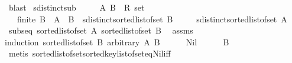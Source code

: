 \begin{isabellebody}
\ blast%
\endisatagproof
{\isafoldproof}%
%
\isadelimproof
\isanewline
%
\endisadelimproof
\isanewline
{}\isamarkupfalse%
\ sdistinct{\isacharunderscore}{\kern0pt}sub{\isacharcolon}{\kern0pt}\isanewline
\ \ \ \ \ A\ B\ {\isacharcolon}{\kern0pt}{\isacharcolon}{\kern0pt}\ {\isachardoublequoteopen}R{}\ set{\isachardoublequoteclose}\isanewline
\ \ \ {\isachardoublequoteopen}finite\ B{\isachardoublequoteclose}\ \ {\isachardoublequoteopen}A\ {\isasymsubseteq}\ B{\isachardoublequoteclose}\ \ {\isachardoublequoteopen}sdistinct{\isacharparenleft}{\kern0pt}sorted{\isacharunderscore}{\kern0pt}list{\isacharunderscore}{\kern0pt}of{\isacharunderscore}{\kern0pt}set\ B{\isacharparenright}{\kern0pt}{\isachardoublequoteclose}\isanewline
\ \ \ \ \ {\isachardoublequoteopen}sdistinct{\isacharparenleft}{\kern0pt}sorted{\isacharunderscore}{\kern0pt}list{\isacharunderscore}{\kern0pt}of{\isacharunderscore}{\kern0pt}set\ A{\isacharparenright}{\kern0pt}{\isachardoublequoteclose}\isanewline
%
\isadelimproof
%
\endisadelimproof
%
\isatagproof
{}\isamarkupfalse%
{\isacharminus}{\kern0pt}\isanewline
\ \ \isamarkupfalse%
\ {\isachardoublequoteopen}subseq\ {\isacharparenleft}{\kern0pt}sorted{\isacharunderscore}{\kern0pt}list{\isacharunderscore}{\kern0pt}of{\isacharunderscore}{\kern0pt}set\ A{\isacharparenright}{\kern0pt}\ {\isacharparenleft}{\kern0pt}sorted{\isacharunderscore}{\kern0pt}list{\isacharunderscore}{\kern0pt}of{\isacharunderscore}{\kern0pt}set\ B{\isacharparenright}{\kern0pt}{\isachardoublequoteclose}\ \isamarkupfalse%
\ assms{\isacharparenleft}{\kern0pt}{}{\isacharcomma}{\kern0pt}{}{\isacharparenright}{\kern0pt}\isanewline
\ \ \isamarkupfalse%
{\isacharparenleft}{\kern0pt}induction\ {\isachardoublequoteopen}sorted{\isacharunderscore}{\kern0pt}list{\isacharunderscore}{\kern0pt}of{\isacharunderscore}{\kern0pt}set\ B{\isachardoublequoteclose}\ arbitrary{\isacharcolon}{\kern0pt}\ A\ B{\isacharparenright}{\kern0pt}\isanewline
\ \ \ \ \isamarkupfalse%
\ Nil\isanewline
\ \ \ \ \isamarkupfalse%
\ {\isachardoublequoteopen}B\ {\isacharequal}{\kern0pt}\ {\isacharbraceleft}{\kern0pt}{\isacharbraceright}{\kern0pt}{\isachardoublequoteclose}\isanewline
\ \ \ \ \ \ \isamarkupfalse%
\ {\isacharparenleft}{\kern0pt}metis\ sorted{\isacharunderscore}{\kern0pt}list{\isacharunderscore}{\kern0pt}of{\isacharunderscore}{\kern0pt}set{\isachardot}{\kern0pt}sorted{\isacharunderscore}{\kern0pt}key{\isacharunderscore}{\kern0pt}list{\isacharunderscore}{\kern0pt}of{\isacharunderscore}{\kern0pt}set{\isacharunderscore}{\kern0pt}eq{\isacharunderscore}{\kern0pt}Nil{\isacharunderscore}{\kern0pt}iff{\isacharparenright}{\kern0pt}\isanewline

\end{isabellebody}
